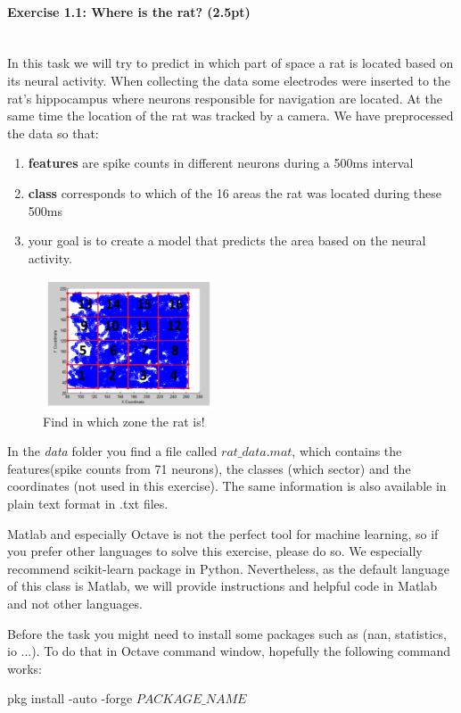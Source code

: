 \documentclass[a4paper,11pt]{article}
\newenvironment{exercise}[3]{\paragraph{Exercise #1: #2 (#3pt)}\ \\}{
\medskip}
\begin{document}
\begin{exercise}{1.1}{Where is the rat?}{2.5}
In this task we will try to predict in which part of space a rat is located based on its neural activity. When collecting the data some electrodes were inserted to the rat's hippocampus where neurons responsible for navigation are located. At the same time the location of the rat was tracked by a camera. We have preprocessed the data so that:
\begin{enumerate}
\item \textbf{features} are spike counts in different neurons during a 500ms interval
\item \textbf{class} corresponds to which of the 16 areas the rat was located during these 500ms
\item your goal is to create a model that predicts the area based on the neural activity.
\end{enumerate}

\begin{figure}
	\centering
	\vspace{-5pt}
	\includegraphics[width=0.45\textwidth]{rat.png}
	\caption{Find in which zone the rat is!}
	\label{fig:rat}
	
\end{figure}

In the \emph{data} folder you find a file called \emph{$rat\_data.mat$}, which contains the features(spike counts from 71 neurons), the classes (which sector) and the coordinates (not used in this exercise). The same information is also available in plain text format in .txt files.

Matlab and especially Octave is not the perfect tool for machine learning, so if you prefer other languages to solve this exercise, please do so. We especially recommend scikit-learn package in Python. Nevertheless, as the default language of this class is Matlab, we will provide instructions and helpful code in Matlab and not other languages.

Before the task you might need to install some packages such as (nan, statistics, io ...). To do that in Octave command window, hopefully the following command works:\\
\begin{center}
pkg install -auto -forge $PACKAGE\_NAME$
\end{center} 



\end{exercise}
\end{document}
